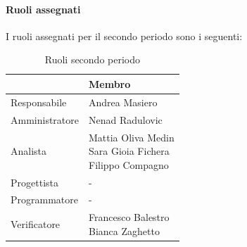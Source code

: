 \documentclass[a4paper,12pt]{article}
\begin{document}
            \paragraph{Ruoli assegnati}
            I ruoli assegnati per il secondo periodo sono i seguenti:
                \begin{table}[H]
                \centering
                \begin{tabular}{|l|l|}
                \hline
                    \rowcolor{lightgray}{\textbf{Ruolo}} & {\textbf{Membro}} \\
                \hline
                    Responsabile & Andrea Masiero \\
                \hline
                    Amministratore & Nenad Radulovic \\
                \hline
                    Analista & \makecell[l]{Mattia Oliva Medin \\ Sara Gioia Fichera \\ Filippo Compagno} \\
                \hline
                    Progettista & - \\
                \hline
                    Programmatore & - \\
                \hline
                    Verificatore & \makecell[l]{Francesco Balestro \\ Bianca Zaghetto} \\
                \hline
                \end{tabular}
                \caption{Ruoli secondo periodo}
                \end{table}
            
\end{document}
